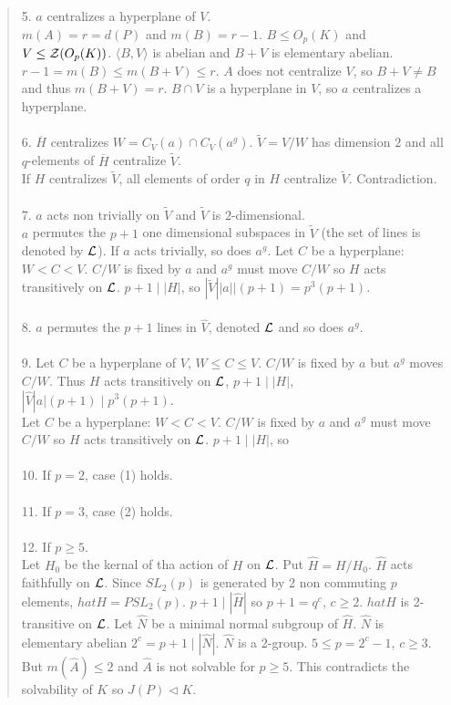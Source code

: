 \begin{quote}
5. $a$ centralizes a hyperplane of $V$.\\
$m(A)=r=d(P)$ and $m(B)=r-1$.  $B \leq O_p(K)$ and $V \leq {\cal Z}(O_p(K))$.  $\langle B, V \rangle$ is abelian and
$B+V$ is elementary abelian.  $r-1 = m(B) \leq m(B+V) \leq r$.  $A$ does not centralize $V$, so $B+V \ne B$ and thus
$m(B+V)=r$.  $B \cap V$ is a hyperplane in $V$, so $a$ centralizes a hyperplane.
\\
\\
6. ${\overline H}$ centralizes $W = C_V(a) \cap C_V(a^g)$.  ${\tilde V} = V /W$ has dimension $2$ and all $q$-elements of
${\overline H}$ centralize ${\tilde V}$.\\
If $H$ centralizes ${\tilde V}$, all elements of order $q$ in $H$ centralize ${\tilde V}$.  Contradiction.
\\
\\
7. $a$ acts non trivially on ${\tilde V}$ and ${\tilde V}$ is $2$-dimensional.\\
$a$ permutes the $p+1$ one dimensional subspaces in ${\tilde V}$ (the set of lines is denoted by ${\cal L}$).
If $a$  acts trivially, so does $a^g$.  Let $C$ be a hyperplane: $W < C < V$.  $C/W$ is fixed by $a$ and $a^g$
must move $C/W$ so $H$ acts transitively on ${\cal L}$.  $p+1 \mid |H|$, so
$|{\tilde V}| |a| |(p+1) = p^3 (p+1)$.
\\
\\
8. $a$ permutes the $p+1$ lines in ${\hat V}$, denoted ${\cal L}$ and so does $a^g$.
\\
\\
9. Let $C$ be a hyperplane of $V$, $W \leq C \leq V$. $C/W$ is fixed by $a$ but $a^g$ moves $C/W$.  Thus $H$ acts transitively
on ${\cal L}$, $p+1 \mid |H|$, $|{\hat V} |a| (p+1) \mid p^3 (p+1)$.\\
Let $C$ be a hyperplane: $W < C < V$.  $C/W$ is fixed by $a$ and $a^g$
must move $C/W$ so $H$ acts transitively on ${\cal L}$.  $p+1 \mid |H|$, so
\\
\\
10. If $p=2$, case (1) holds.
\\
\\
11. If $p=3$, case (2) holds.
\\
\\
12. If $p\geq 5$. \\
Let $H_0$ be the kernal of tha action of $H$ on ${\cal L}$. Put ${\hat H} = H/H_0$. ${\hat H}$ acts faithfully on ${\cal L}$.
Since $SL_2(p)$ is generated by 2 non commuting $p$ elements, ${hat H} = PSL_2(p)$.   $p+1 \mid |{\hat H}|$ so $p+1=q^c$, $c \geq 2$.
${hat H}$ is 2-transitive on ${\cal L}$.  Let ${\hat N}$ be a minimal normal subgroup of ${\hat H}$.  ${\hat N}$ is elementary
abelian $2^c=p+1 \mid |{\hat N}|$. ${\hat N}$ is a 2-group. $5 \leq p= 2^c-1$, $c \geq 3$.  But $m({\hat A}) \leq 2$ and
${\hat A}$ is not solvable for $p \geq 5$.  This contradicts the solvability of $K$ so $J(P) \lhd K$.

\end{quote}
